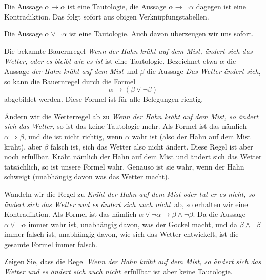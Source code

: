 \begin{beispiel} Die Aussage $\alpha \rightarrow \alpha$ ist eine Tautologie, die Aussage $\alpha \rightarrow 
\neg \alpha$ dagegen ist eine Kontradiktion. Das folgt sofort aus obigen Verknüpfungstabellen.
\end{beispiel}

\begin{beispiel} Die Aussage $\alpha \vee \neg \alpha$ ist eine Tautologie. Auch davon überzeugen wir uns 
sofort.
\end{beispiel}

\begin{beispiel} Die bekannte Bauernregel \textit{Wenn der Hahn kräht auf dem Mist, ändert sich das Wetter, 
oder es bleibt wie es ist} ist eine Tautologie. Bezeichnet etwa $\alpha$ die Aussage \textit{der Hahn kräht auf dem 
Mist} und $\beta$ die Aussage \textit{Das Wetter ändert sich}, so kann die Bauernregel durch die Formel
  	$$ \alpha \rightarrow (\beta \vee \neg \beta) $$
abgebildet werden. Diese Formel ist für alle Belegungen richtig.


Ändern wir die Wetterregel ab zu  \textit{Wenn der Hahn kräht auf dem Mist, so ändert sich das Wetter}, so ist das  
keine Tautologie mehr. Als Formel ist das nämlich $\alpha \Longrightarrow \beta$, und die ist nicht richtig, 
wenn $\alpha$ wahr ist (also der Hahn auf dem Mist kräht), aber $\beta$ falsch ist, 
sich das Wetter also nicht ändert. Diese Regel ist aber noch erfüllbar. Kräht nämlich der Hahn auf 
dem Mist und ändert sich das Wetter tatsächlich, so ist unsere Formel wahr. 
Genauso ist sie wahr, wenn der Hahn schweigt (unabhängig davon was das Wetter macht).

Wandeln wir die Regel zu \textit{Kräht der Hahn auf dem Mist oder tut er es nicht, so ändert sich das Wetter und 
es ändert sich auch nicht\,} ab, so erhalten wir eine Kontradiktion. Als Formel ist das nämlich $\alpha \vee \neg \alpha 
\longrightarrow \beta \wedge \neg \beta$. Da die Aussage $\alpha \vee \neg \alpha$ immer wahr ist, unabhängig 
davon, was der Gockel macht, und da $ \beta \wedge \neg \beta$ immer falsch ist, unabhängig davon, wie 
sich das Wetter entwickelt, ist die gesamte Formel immer falsch.
\end{beispiel}

\begin{aufgabe}\label{logik_aufgabe_2} 
Zeigen Sie, dass die Regel \textit{Wenn der Hahn kräht auf dem Mist, so ändert sich das Wetter und 
es ändert sich auch nicht\,} erfüllbar ist aber keine Tautologie.
\end{aufgabe}

